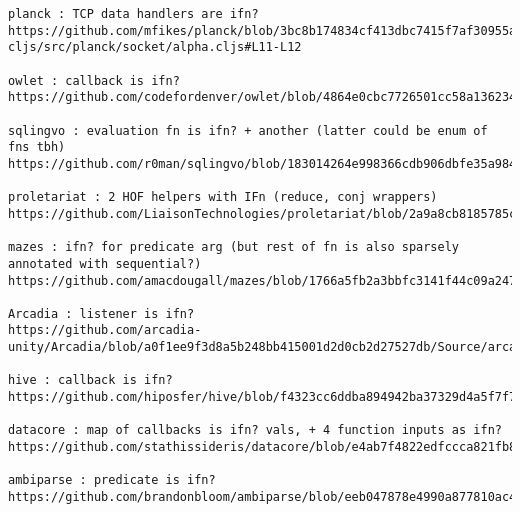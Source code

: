 \begin{verbatim}
planck : TCP data handlers are ifn?
https://github.com/mfikes/planck/blob/3bc8b174834cf413dbc7415f7af30955adcc27b0/planck-cljs/src/planck/socket/alpha.cljs#L11-L12

owlet : callback is ifn?
https://github.com/codefordenver/owlet/blob/4864e0cbc7726501cc58a1362347f07f10524ed7/src/cljs/owlet/views/confirm.cljs#L12

sqlingvo : evaluation fn is ifn? + another (latter could be enum of fns tbh)
https://github.com/r0man/sqlingvo/blob/183014264e998366cdb906dbfe35a984c7d5443f/src/sqlingvo/db.cljc

proletariat : 2 HOF helpers with IFn (reduce, conj wrappers)
https://github.com/LiaisonTechnologies/proletariat/blob/2a9a8cb8185785cb1d12376da21ddb97d5e43d51/src/proletariat/core.clj#L566

mazes : ifn? for predicate arg (but rest of fn is also sparsely annotated with sequential?)
https://github.com/amacdougall/mazes/blob/1766a5fb2a3bbfc3141f44c09a2477a1ec65edef/src/cljc/mazes/generators/wilson.cljc#L36

Arcadia : listener is ifn?
https://github.com/arcadia-unity/Arcadia/blob/a0f1ee9f3d8a5b248bb415001d2d0cb2d27527db/Source/arcadia/internal/state.clj#L52

hive : callback is ifn?
https://github.com/hiposfer/hive/blob/f4323cc6ddba894942ba37329d4a5f7f7f974024/src/hive/services/raw/location.cljs#L12

datacore : map of callbacks is ifn? vals, + 4 function inputs as ifn?
https://github.com/stathissideris/datacore/blob/e4ab7f4822edfccca821fb8f4f9ec81a69e9d056/src/datacore/cells.clj#L59

ambiparse : predicate is ifn?
https://github.com/brandonbloom/ambiparse/blob/eeb047878e4990a877810ac4805a45d8cfe9acfb/src/ambiparse/gll.clj#L175
\end{verbatim}
\endgroup
